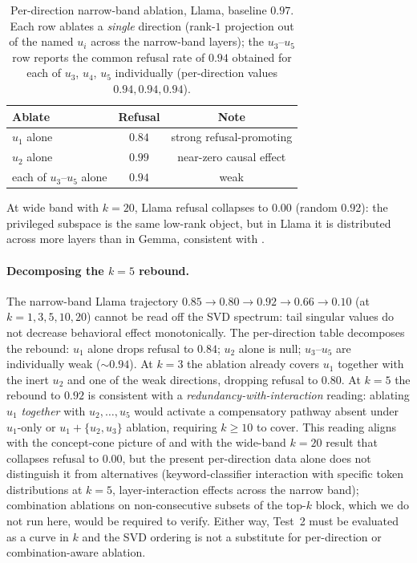 \documentclass[10pt]{article}
\theoremstyle{definition}
\theoremstyle{remark}
\begin{document}
\begin{table}[h]\centering
\caption{Per-direction narrow-band ablation,
Llama, baseline $0.97$.  Each row ablates a
\emph{single} direction (rank-$1$ projection out of the
named $u_i$ across the narrow-band layers); the
$u_3$--$u_5$ row reports the common refusal rate of
$0.94$ obtained for each of $u_3$, $u_4$, $u_5$
individually (per-direction values $0.94, 0.94, 0.94$).}
\label{tab:perdir_llama_body}
\begin{tabular}{@{}lcc@{}}
\toprule
Ablate & Refusal & Note \\
\midrule
$u_1$ alone & $0.84$ & strong refusal-promoting \\
$u_2$ alone & $0.99$ & near-zero causal effect \\
each of $u_3$--$u_5$ alone & $0.94$ & weak \\
\bottomrule
\end{tabular}
\end{table}

At wide band with $k=20$, Llama refusal collapses to
$\mathbf{0.00}$ (random $0.92$): the privileged
subspace is the same low-rank object, but in Llama it
is distributed across more layers than in Gemma,
consistent with \citep{arditi2024refusal, wollschlager2025}.

\paragraph{Decomposing the $k=5$ rebound.}
The narrow-band Llama trajectory
$0.85 \to 0.80 \to \mathbf{0.92} \to 0.66 \to 0.10$
(at $k = 1,3,5,10,20$) cannot be read off the SVD
spectrum: tail singular values do not decrease
behavioral effect monotonically.  The per-direction
table decomposes the rebound: $u_1$ alone drops
refusal to $0.84$; $u_2$ alone is null; $u_3$--$u_5$
are individually weak ($\sim 0.94$).  At $k=3$ the
ablation already covers $u_1$ together with the inert
$u_2$ and one of the
weak directions, dropping refusal to $0.80$.  At $k=5$ the rebound to $0.92$ is consistent with a
\emph{redundancy-with-interaction} reading: ablating
$u_1$ \emph{together} with $u_2,\ldots,u_5$ would
activate a compensatory pathway absent under $u_1$-only
or $u_1+\{u_2,u_3\}$ ablation, requiring $k\geq 10$ to
cover.  This reading aligns with the concept-cone picture of
\citet{wollschlager2025} and with the wide-band
$k=20$ result that collapses refusal to $\mathbf{0.00}$,
but the present per-direction data alone does not
distinguish it from alternatives (keyword-classifier
interaction with specific token distributions at
$k=5$, layer-interaction effects across the narrow
band); combination ablations on non-consecutive
subsets of the top-$k$ block, which we do not run
here, would be required to verify.  Either way, Test~2
must be evaluated as a curve in $k$ and the SVD
ordering is not a substitute for per-direction or
combination-aware ablation.
\end{document}
